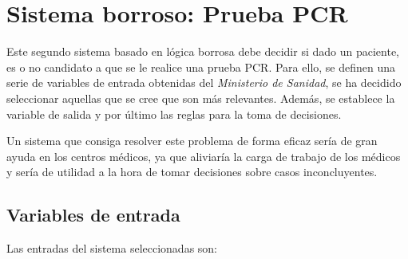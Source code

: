 \documentclass[12pt,a4paper, xcolor=table]{article}
\begin{document}
\clearpage

\section{Sistema borroso: Prueba PCR}

Este segundo sistema basado en lógica borrosa debe decidir si dado un paciente, es o no candidato a que se le realice una prueba PCR. Para ello, se definen una serie de variables de entrada obtenidas del \textit{Ministerio de Sanidad}\cite{paciente}, se ha decidido seleccionar aquellas que se cree que son más relevantes. Además, se establece la variable de salida y por último las reglas para la toma de decisiones.

\vspace{2mm}

Un sistema que consiga resolver este problema de forma eficaz sería de gran ayuda en los centros médicos, ya que aliviaría la carga de trabajo de los médicos y sería de utilidad a la hora de tomar decisiones sobre casos inconcluyentes.


\subsection{Variables de entrada}

Las entradas del sistema seleccionadas son:
\end{document}
